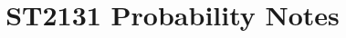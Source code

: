 \documentclass[a4paper, 12pt, fleqn]{book}
\begin{document}
\title{ST2131 Probability Notes}
\date{}
\maketitle

\tableofcontents





\end{document}
